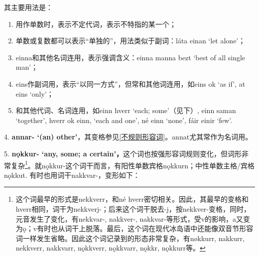 其主要用法是：

\begin{enumerate}
  \def\labelenumi{\Alph{enumi}.}
  \item
        用作单数时，表示不定代词，表示不特指的某一个；
  \item
        单数或复数都可以表示``单独的''，用法类似于副词：láta einan `let
        alone'；
  \item
        einna和其他名词连用，表示强调含义：einna manna bezt `best of all
        single man'；
  \item
        eins作副词用，表示``以同一方式''，但常和其他词连用，如eins ok `as if',
        at eins `only'；
  \item
        和其他代词、名词连用，如einn hverr `each; some‌'（见下）, einn saman
        `together', hverr ok einn, `each and one', né einn `none', fáir einir
        `few'.
\end{enumerate}

4. \textbf{annar- `(an)
  other‌'}，其变格参见\ref{不规则形容词}。annat尤其常作为名词用。

5. \textbf{nǫkkur- `any, some; a
  certain‌'，}这个词也按强形容词规则变化，但词形非常复杂\footnote{这个词最早的形式是nekkverr，和né
  hverr密切相关。因此，其最早的变格和hverr相同，词干为nekkverj-；后来这个词干脱去-j，按nekkver-变格，同时，元音发生了变化，有nekkvar-,
  nakkver-,
  nakkvar-等形式，受v的影响，a又变为ǫ；v有时也从词干上脱落。最后，这个词在现代冰岛语中还能像双音节形容词一样发生省略。因此这个词记录到的形态非常复杂，有nøkkurr,
  nakkurr, nekkverr, nakkvarr, nǫkkverr, nǫkkvarr, nǫkkr, nǫkkurr等。}。就nǫkkur-这个词干而言，有阳性单数宾格nǫkkurn；中性单数主格/宾格nǫkkut.
有时也用词干nakkvar-，变形如下：

